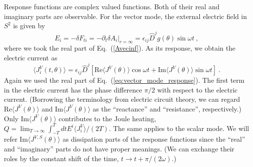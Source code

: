 \documentclass[a4paper,11pt]{article}
\begin{document}
    Response functions are complex valued functions. Both of their real and imaginary parts are observable.
    For the vector mode, the external electric field in $S^2$ is given by
    \begin{equation}
    E_i = -\delta F_{ti}= -\partial_t \delta A_i |_{r=\infty}=  \epsilon_{ij}\hat{D}^j g(\theta) \sin \omega t\ ,
    \end{equation}
    where we took the real part of Eq.~(\ref{Avecinf}). 
    As its response, we obtain the electric current as
    \begin{equation}
        \langle J^V_i(t,\theta)\rangle =  \epsilon_{ij}\hat{D}^j \left[\textrm{Re} \langle J^V(\theta)\rangle \cos\omega t +  \textrm{Im} \langle J^V(\theta)\rangle \sin\omega t \right]\ .
    \end{equation}
    Again we used the real part of Eq.~(\ref{eq:vector_mode_response}). 
    The first term in the electric current has the phase difference $\pi/2$ with respect to the electric current. (Borrowing the terminology from electric circuit theory, 
    we can regard $\textrm{Re} \langle J^V(\theta)\rangle$ and $\textrm{Im} \langle J^V(\theta)\rangle$ as the ``reactance'' and  ``resistance'', respectively.)
    Only $\textrm{Im} \langle J^V(\theta)\rangle$ contributes to the Joule heating, $Q=\lim_{T\to \infty}\int_{-T}^{T} dt E^i \langle J^V_i \rangle/(2T)$. 
    The same applies to the scalar mode. We will refer $\textrm{Im}\langle J^{V,S}(\theta) \rangle$ as dissipation parts of the response functions since the ``real'' and ``imaginary'' parts do not have proper meanings. (We can exchange their roles by the constant shift of the time, $t\to t+\pi/(2\omega)$.)
    
\end{document}
